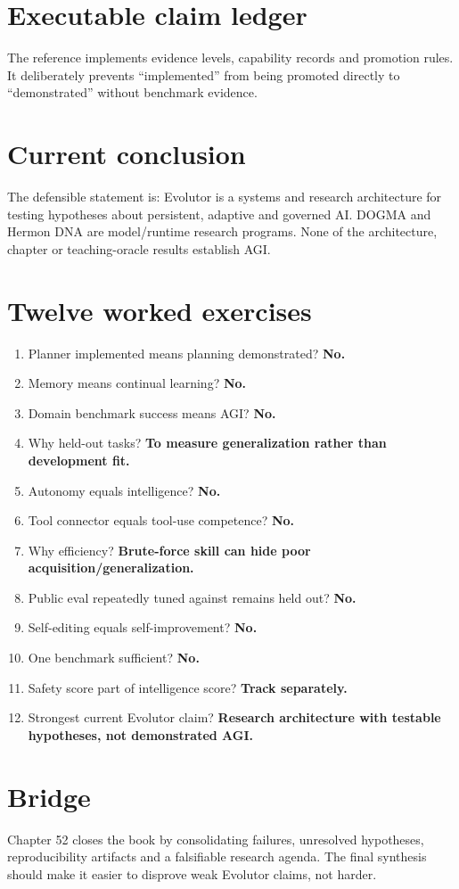 \section{Executable claim ledger}
The reference implements evidence levels, capability records and promotion rules. It deliberately prevents ``implemented'' from being promoted directly to ``demonstrated'' without benchmark evidence.

\section{Current conclusion}
The defensible statement is: Evolutor is a systems and research architecture for testing hypotheses about persistent, adaptive and governed AI. DOGMA and Hermon DNA are model/runtime research programs. None of the architecture, chapter or teaching-oracle results establish AGI.

\section{Twelve worked exercises}
\begin{enumerate}
\item Planner implemented means planning demonstrated? \textbf{No.}
\item Memory means continual learning? \textbf{No.}
\item Domain benchmark success means AGI? \textbf{No.}
\item Why held-out tasks? \textbf{To measure generalization rather than development fit.}
\item Autonomy equals intelligence? \textbf{No.}
\item Tool connector equals tool-use competence? \textbf{No.}
\item Why efficiency? \textbf{Brute-force skill can hide poor acquisition/generalization.}
\item Public eval repeatedly tuned against remains held out? \textbf{No.}
\item Self-editing equals self-improvement? \textbf{No.}
\item One benchmark sufficient? \textbf{No.}
\item Safety score part of intelligence score? \textbf{Track separately.}
\item Strongest current Evolutor claim? \textbf{Research architecture with testable hypotheses, not demonstrated AGI.}
\end{enumerate}

\section{Bridge}
Chapter 52 closes the book by consolidating failures, unresolved hypotheses, reproducibility artifacts and a falsifiable research agenda. The final synthesis should make it easier to disprove weak Evolutor claims, not harder.
